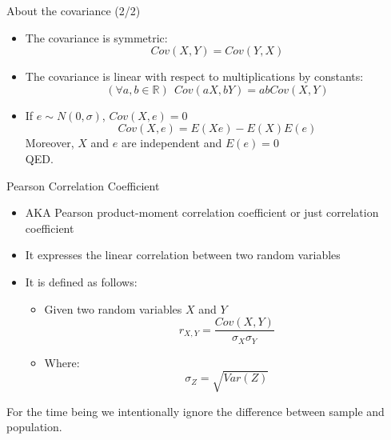 \documentclass{beamer}
\begin{document}
\begin{frame}
{\centerline{About the covariance (2/2)}} \label{P:Covariance2}

\begin{itemize}
\item The covariance is symmetric:
 $$Cov(X,Y) = Cov(Y,X)$$
\item The covariance is linear with respect to multiplications by constants:
 $$(\forall a, b \in \mathbb{R}) ~~ Cov(aX,bY) = abCov(X,Y)$$

\item If $e \sim N(0,\sigma)$, $Cov(X,e) = 0$
$$Cov(X,e) =  E(Xe) - E(X)E(e) $$
Moreover, $X$ and $e$ are independent and $E(e) = 0$\\
QED.
\end{itemize}


\end{frame}


\begin{frame}
{\centerline{Pearson Correlation Coefficient}} \label{P:Pearson}

\begin{itemize}
\item AKA Pearson product-moment correlation coefficient or just correlation coefficient
\item It expresses the linear correlation between two random variables
\item It is defined as follows:
\begin{itemize}
\item Given two random variables $X$ and $Y$
$$r_{X,Y} = \frac{Cov(X,Y)}{\sigma_X\sigma_Y}$$
\item Where:
$$\sigma_Z = \sqrt{Var(Z)}$$
\end{itemize}
\end{itemize}

\vspace*{0.5cm}

\begin{center}
\small  For the time being we intentionally ignore the difference between sample and population.
\end{center}

\end{frame}
\end{document}
